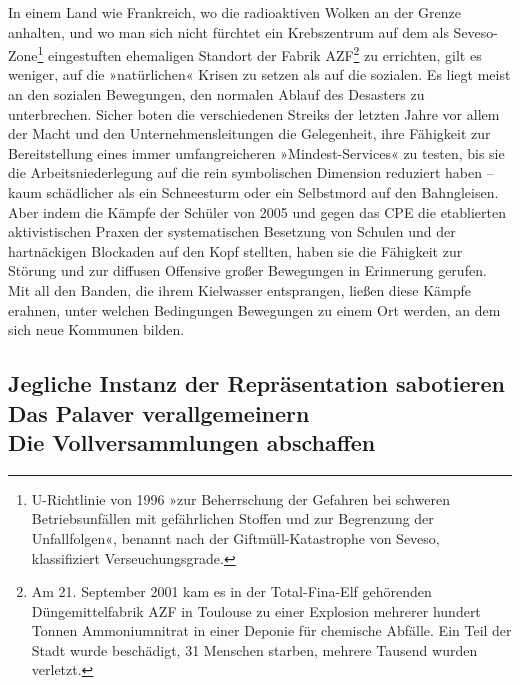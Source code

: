 In einem Land wie Frankreich, wo die radioaktiven Wolken an der
Grenze anhalten, und wo man sich nicht fürchtet ein Krebszentrum
auf dem als Seveso-Zone\footnote{
U-Richtlinie von 1996 »zur Beherrschung der Gefahren bei
schweren Betriebsunfällen mit gefährlichen Stoffen und zur
Begrenzung der Unfallfolgen«, benannt nach der Giftmüll-Katastrophe
von Seveso, klassifiziert Verseuchungsgrade.
}
eingestuften ehemaligen Standort der
Fabrik AZF\footnote{
Am 21. September 2001 kam es in der Total-Fina-Elf gehörenden
Düngemittelfabrik AZF in Toulouse zu einer Explosion mehrerer
hundert Tonnen Ammoniumnitrat in einer Deponie für chemische
Abfälle. Ein Teil der Stadt wurde beschädigt, 31 Menschen starben,
mehrere Tausend wurden verletzt.
}%
zu errichten, gilt es weniger, auf die »natürlichen«
Krisen zu setzen als auf die sozialen. Es liegt meist an den
sozialen Bewegungen, den normalen Ablauf des Desasters zu
unterbrechen. Sicher boten die verschiedenen Streiks der letzten
Jahre vor allem der Macht und den Unternehmensleitungen die
Gelegenheit, ihre Fähigkeit zur Bereitstellung eines immer
umfangreicheren »Mindest-Services« zu testen, bis sie die
Arbeitsniederlegung auf die rein symbolischen Dimension reduziert
haben – kaum schädlicher als ein Schneesturm oder ein Selbstmord
auf den Bahngleisen. Aber indem die Kämpfe der Schüler von 2005 und
gegen das CPE die etablierten aktivistischen Praxen der
systematischen Besetzung von Schulen und der hartnäckigen Blockaden
auf den Kopf stellten, haben sie die Fähigkeit zur Störung und zur
diffusen Offensive großer Bewegungen in Erinnerung gerufen. Mit all
den Banden, die ihrem Kielwasser entsprangen, ließen diese Kämpfe
erahnen, unter welchen Bedingungen Bewegungen zu einem Ort werden,
an dem sich neue Kommunen bilden.

\subsection{Jegliche Instanz der Repräsentation sabotieren\\
Das Palaver verallgemeinern\\
Die Vollversammlungen abschaffen}

